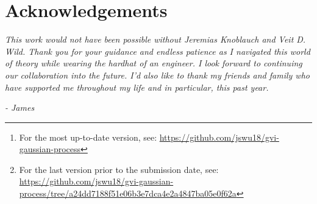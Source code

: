 \documentclass{article}
\numberwithin{equation}{section}
\begin{document}
\begin{abstract}
Proposed by \cite{knoblauch2022optimization}, generalised variational inference (GVI) is a learning framework motivated by an optimisation-centric interpretation of Bayesian inference. 
Extending GVI to infinite dimensions, \cite{wild2022generalized} introduces Gaussian Wasserstein Inference (GWI) in function spaces. 
GWI demonstrates a new inference approach for variational GPs, circumventing many limitations of previous approaches.
Our work introduces various improvements to GWI for GPs, including new kernel parameterisations such as the NNGP kernels from \cite{novak2019neural}. We also introduce a new learning framework that we call projected GVI (pGVI) for GPs. 
pGVI weakens the GVI assumptions of a definite regulariser.
Instead, we propose regularising between scalar projections of the stochastic processes, an approach we call projected regularisation.
We demonstrate that pGVI is a highly flexible and well-performing variational inference framework with significantly cheaper linearly scaling computational costs compared to the cubic costs of existing approaches.
We also present our learning frameworks through a comprehensive software implementation available on 
\href{https://github.com/jswu18/gvi-gaussian-process}{GitHub}\footnote{For the most up-to-date version, see: \href{https://github.com/jswu18/gvi-gaussian-process}{https://github.com/jswu18/gvi-gaussian-process}} 
\footnote{
For the last version prior to the submission date, see: \href{https://github.com/jswu18/gvi-gaussian-process/tree/a24dd7188f51e06b3e7dca4e2a4847ba05e0f62a}{https://github.com/jswu18/gvi-gaussian-process/tree/a24dd7188f51e06b3e7dca4e2a4847ba05e0f62a}}.
\end{abstract}

\newpage
\section*{Acknowledgements}
\textit{This work would not have been possible without Jeremias Knoblauch and Veit D. Wild. 
Thank you for your guidance and endless patience as I navigated this world of theory while wearing the hardhat of an engineer. 
I look forward to continuing our collaboration into the future.
I’d also like to thank my friends and family who have supported me throughout my life and in particular, this past year. 
}

\hspace*{\fill} \textit{- James}

\newpage
\tableofcontents
\newpage
{}
\setcounter{page}{1}
\setcounter{section}{-1}
\end{document}
